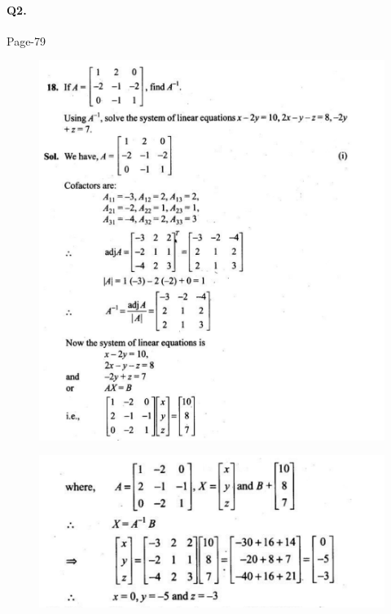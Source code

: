 \documentclass{article}
\begin{document}
\paragraph{Q2.}
\begin{flushright}
Page-79
\end{flushright}
\begin{figure}[H]
    \includegraphics[scale=0.5]{determinants_l4_ps_11.png}
\end{figure}
\begin{figure}[H]
    \includegraphics[scale=0.5]{determinants_l4_ps_12.png}
\end{figure}
\clearpage
\end{document}
